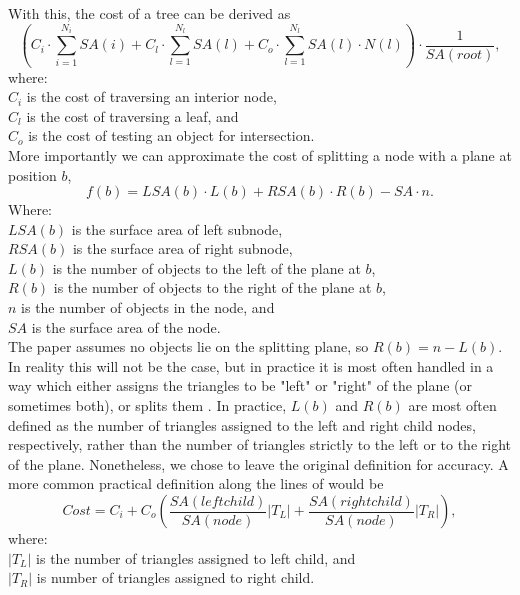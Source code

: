 \documentclass[12pt]{article}
\begin{document}
\noindent With this, the cost of a tree can be derived as
\[
	\left( C_i \cdot \sum_{i=1}^{N_i}{SA(i)} + C_l \cdot \sum_{l=1}^{N_l}{SA(l) + C_o \cdot \sum_{l=1}^{N_l}{SA(l) \cdot N(l)}} \right) \cdot \frac{1}{SA(root)},
\]
where:\\
$C_i$ is the cost of traversing an interior node,\\
$C_l$ is the cost of traversing a leaf, and\\
$C_o$ is the cost of testing an object for intersection.\\

\noindent More importantly we can approximate the cost of splitting a node with a plane at position $b$,
\begin{equation}
	\label{eq:sah}
	f(b) = LSA(b) \cdot L(b) + RSA(b) \cdot R(b) - SA \cdot n.
\end{equation}
\noindent Where:\\
$LSA(b)$ is the surface area of left subnode,\\
$RSA(b)$ is the surface area of right subnode,\\
$L(b)$ is the number of objects to the left of the plane at $b$,\\
$R(b)$ is the number of objects to the right of the plane at $b$,\\
$n$ is the number of objects in the node, and\\
$SA$ is the surface area of the node.\\

\noindent The paper assumes no objects lie on the splitting plane, so $R(b) = n - L(b)$. In reality this will not be the case, but in practice it is most often handled in a way which either assigns the triangles to be "left" or "right" of the plane (or sometimes both), or splits them \cite{havran2002improving}. In practice, $L(b)$ and $R(b)$ are most often defined as the number of triangles assigned to the left and right child nodes, respectively, rather than the number of triangles strictly to the left or to the right of the plane. Nonetheless, we chose to leave the original definition for accuracy. A more common practical definition along the lines of \cite{wald2006building} would be\\
\begin{equation}
	\label{eq:tsah}
	Cost = C_i + C_o \left(\frac{SA(left child)}{SA(node)}|T_L| + \frac{SA(right child)}{SA(node)}|T_R| \right),
\end{equation}
\noindent where:\\
$|T_L|$ is the number of triangles assigned to left child, and\\
$|T_R|$ is number of triangles assigned to right child.\\
\end{document}

